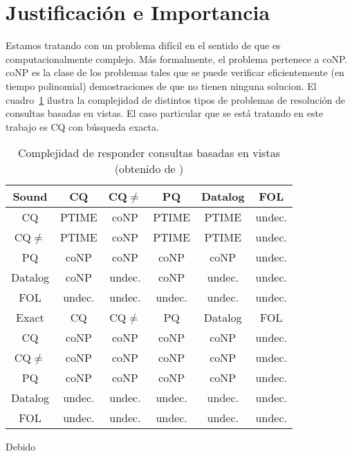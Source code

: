 \section{Justificación e Importancia}

Estamos tratando con un problema difícil \cite{lenzerini:dataintegration} en el
sentido de que es computacionalmente complejo. Más formalmente, el problema
pertenece a coNP.
coNP es la clase de los problemas tales que se puede verificar eficientemente (en
tiempo polinomial) demostraciones de que no tienen ninguna solucion.
El cuadro~\ref{cqcomplexity}
ilustra la complejidad de distintos tipos de
problemas de resolución de consultas basadas en vistas. El caso particular que
se está tratando en este trabajo es CQ con búsqueda exacta.

\begin{table}
\begin{center}
  \begin{tabular}{|c||c|c|c|c|c|}
\hline
Sound  &  CQ  & CQ$\neq$  & PQ  &Datalog &FOL \\
\hline
  CQ  & PTIME &coNP  &PTIME &PTIME  &undec. \\
 CQ$\neq$  & PTIME &coNP  &PTIME &PTIME  &undec. \\
  PQ  &  coNP &coNP  & coNP & coNP  &undec. \\
Datalog &coNP &undec.& coNP &undec. &undec. \\
 FOL  & undec.&undec.&undec.&undec. &undec. \\
\hline
 Exact  & CQ &  CQ$\neq$     &  PQ  &Datalog &FOL \\
\hline
  CQ    &coNP &coNP  & coNP & coNP  &undec. \\
 CQ$\neq$    &coNP &coNP  & coNP & coNP  &undec. \\
  PQ    &coNP &coNP  & coNP & coNP  &undec. \\
Datalog&undec.&undec.&undec.&undec. &undec. \\
 FOL   &undec.&undec.&undec.&undec. &undec. \\
\hline
  \end{tabular}
  \caption{Complejidad de responder consultas basadas en vistas (obtenido de
\cite{lenzerini:dataintegration})}
  \label{cqcomplexity}
\end{center}
\end{table}

Debido

